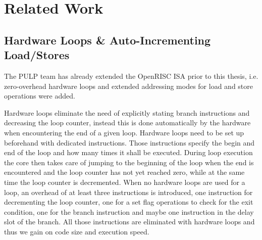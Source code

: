 
\chapter{Related Work}

\label{chapter:related_work}


\section{Hardware Loops \& Auto-Incrementing Load/Stores}
\label{sec:or10n_hwlp_prepost}

The \gls{PULP} team has already extended the OpenRISC \gls{ISA} prior to this
thesis, i.e. zero-overhead hardware loops and extended addressing modes for load
and store operations were added.

Hardware loops eliminate the need of explicitly stating branch instructions
and decreasing the loop counter, instead this is done automatically by the
hardware when encountering the end of a given loop.
Hardware loops need to be set up beforehand with dedicated instructions. Those
instructions specify the begin and end of the loop and how many times it shall
be executed. During loop execution the core then takes care of jumping to the
beginning of the loop when the end is encountered and the loop counter has not
yet reached zero, while at the same time the loop counter is decremented.
When no hardware loops are used for a loop, an overhead of at least three
instructions is introduced, one instruction for decrementing the loop counter,
one for a set flag operations to check for the exit condition, one for
the branch instruction and maybe one instruction in the delay slot of the
branch. All those instructions are eliminated with hardware loops and thus we
gain on code size and execution speed.


